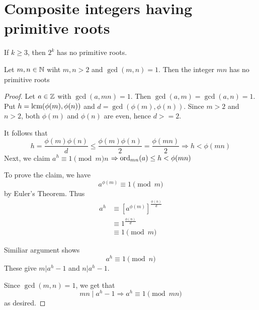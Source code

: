 \section{Composite integers having primitive roots}
\setcounter{theorem}{-1}
\begin{theorem}
    If $k \geq 3$, then $2^k$ has no primitive roots.
\end{theorem}
\setcounter{theorem}{7}
\begin{theorem}
    Let $m, n \in \mathbb{N}$ wiht $m, n > 2$ and $\gcd(m, n) = 1$.
    Then the integer $mn$ has no primitive roots
\end{theorem}
\begin{proof}
    Let $a \in \mathbb{Z}$ with $\gcd(a, mn) = 1$. Then $\gcd(a, m) = \gcd(a, n) = 1$.
    Put $h = \text{lcm}(\phi(m), \phi(n))$ and $d = \gcd(\phi(m), \phi(n))$.
    Since $m > 2$ and $n > 2$, both $\phi(m)$ and $\phi(n)$ are even, hence $d >= 2$.

    It follows that
    \[
        h = \frac{\phi(m)\phi(n)}{d} \leq \frac{\phi(m)\phi(n)}{2} = \frac{\phi(mn)}{2} \Rightarrow h < \phi(mn)
    \]
    Next, we claim $a^h \equiv 1 \pmod mn$
    $\Rightarrow \text{ord}_{mn}(a) \leq h < \phi(mn)$

    To prove the claim, we have
    \[
        a^{\phi(m)} \equiv 1 \pmod m
    \]
    by Euler's Theorem. Thus 
    \[
        \begin{aligned}
            a^h &\equiv {[a^{\phi(m)}]}^\frac{\phi(n)}{d}\\
            & \equiv 1^\frac{\phi(n)}{d}\\
            & \equiv 1 \pmod m
        \end{aligned}
    \]

    Similiar argument shows 
    \[
        a^h \equiv 1 \pmod n
    \]
    These give $m | a^h - 1$ and $n | a^h - 1$.

    Since $\gcd(m, n) = 1$, we get that
    \[
        mn \; | \; a^h - 1 \Rightarrow a^h \equiv 1 \pmod{mn}
    \]
    as desired.
\end{proof}

